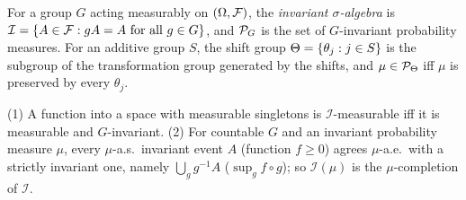\begin{definition}
    \label{def:erg-invariant-events}
    \leanok

    For a group $G$ acting measurably on $(\Omega, \mathcal{F})$, the \emph{invariant
    $\sigma$-algebra} is $\mathcal{I} = \left\{ A \in \mathcal{F} : gA = A \text{ for all } g \in G \right\}$,
    and $\mathcal{P}_G$ is the set of $G$-invariant probability measures. For an additive group $S$,
    the shift group $\Theta = \left\{ \theta_j : j \in S \right\}$ is the subgroup of the transformation
    group generated by the shifts, and $\mu \in \mathcal{P}_\Theta$ iff $\mu$ is preserved by every
    $\theta_j$.
\end{definition}

\begin{lemma}
    \label{lem:erg-143}
    \leanok

    (1) A function into a space with measurable singletons is $\mathcal{I}$-measurable iff it is
    measurable and $G$-invariant. (2) For countable $G$ and an invariant probability measure
    $\mu$, every $\mu$-a.s.\ invariant event $A$ (function $f \geq 0$) agrees $\mu$-a.e.\ with a
    strictly invariant one, namely $\bigcup_g g^{-1}A$ ($\sup_g f \circ g$); so $\mathcal{I}(\mu)$
    is the $\mu$-completion of $\mathcal{I}$.
\end{lemma}

